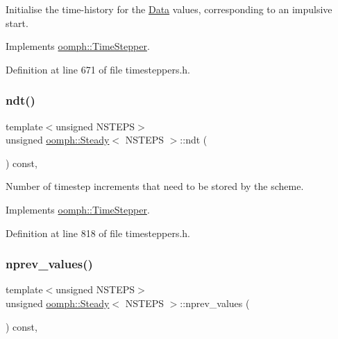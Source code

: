 Initialise the time-\/history for the \hyperlink{classoomph_1_1Data}{Data} values, corresponding to an impulsive start. 



Implements \hyperlink{classoomph_1_1TimeStepper_a7e894df13c88c96dd8eced2700228225}{oomph\+::\+Time\+Stepper}.



Definition at line 671 of file timesteppers.\+h.

\mbox{\label{classoomph_1_1Steady_add50fd00901dc87069f2404014d699f7}} 
\subsubsection{\texorpdfstring{ndt()}{ndt()}}
{\footnotesize\ttfamily template$<$unsigned N\+S\+T\+E\+PS$>$ \\
unsigned \hyperlink{classoomph_1_1Steady}{oomph\+::\+Steady}$<$ N\+S\+T\+E\+PS $>$\+::ndt (\begin{DoxyParamCaption}{ }\end{DoxyParamCaption}) const\hspace{0.3cm}{\ttfamily [inline]}, {\ttfamily [virtual]}}



Number of timestep increments that need to be stored by the scheme. 



Implements \hyperlink{classoomph_1_1TimeStepper_a00e57b6436cff4fc82af481b81a78a1a}{oomph\+::\+Time\+Stepper}.



Definition at line 818 of file timesteppers.\+h.

\mbox{\label{classoomph_1_1Steady_acb34aea820a95d50b4dd7a8e92bea91a}} 
\subsubsection{\texorpdfstring{nprev\+\_\+values()}{nprev\_values()}}
{\footnotesize\ttfamily template$<$unsigned N\+S\+T\+E\+PS$>$ \\
unsigned \hyperlink{classoomph_1_1Steady}{oomph\+::\+Steady}$<$ N\+S\+T\+E\+PS $>$\+::nprev\+\_\+values (\begin{DoxyParamCaption}{ }\end{DoxyParamCaption}) const\hspace{0.3cm}{\ttfamily [inline]}, {\ttfamily [virtual]}}



